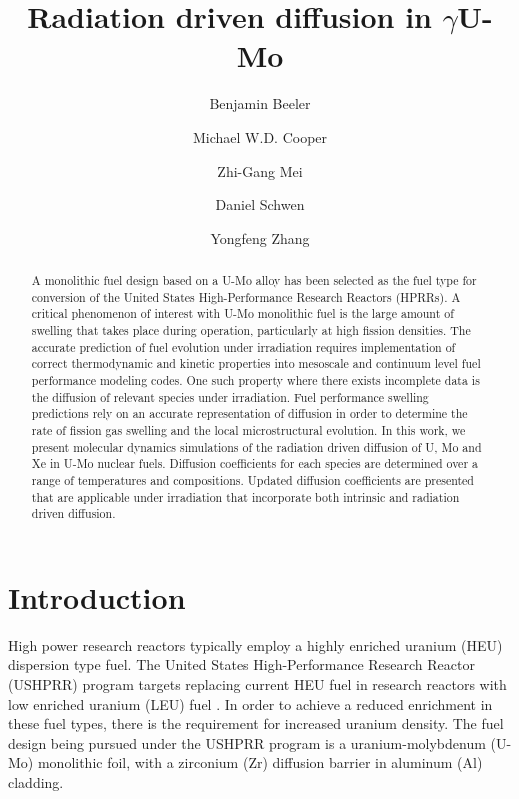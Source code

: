 \documentclass[review]{elsarticle}
\begin{document}
\begin{frontmatter}
\title{Radiation driven diffusion in $\gamma$U-Mo}

\author[ncsu,inl]{Benjamin Beeler}
\author[lanl]{Michael W.D. Cooper}
\author[anl]{Zhi-Gang Mei}
\author[inl]{Daniel Schwen}
\author[wisc,inl]{Yongfeng Zhang}
\address[ncsu]{North Carolina State University, Raleigh, NC 27695}
\address[inl]{Idaho National Laboratory, Idaho Falls, ID 83415}
\address[lanl]{Los Alamos National Laboratory, Los Alamos, NM 87545}
\address[anl]{Argonne National Laboratory, Lemont, IL 60439}
\address[wisc]{University of Wisconsin-Madison, Madison, WI 53715}

\begin{abstract}
A monolithic fuel design based on a U-Mo alloy has been selected as the fuel type for conversion of the United States High-Performance Research Reactors (HPRRs). A critical phenomenon of interest with U-Mo monolithic fuel is the large amount of swelling that takes place during operation, particularly at high fission densities. The accurate prediction of fuel evolution under irradiation requires implementation of correct thermodynamic and kinetic properties into mesoscale and continuum level fuel performance modeling codes. One such property where there exists incomplete data is the diffusion of relevant species under irradiation. Fuel performance swelling predictions rely on an accurate representation of diffusion in order to determine the rate of fission gas swelling and the local microstructural evolution. In this work, we present molecular dynamics simulations of the radiation driven diffusion of U, Mo and Xe in U-Mo nuclear fuels. Diffusion coefficients for each species are determined over a range of temperatures and compositions. Updated diffusion coefficients are presented that are applicable under irradiation that incorporate both intrinsic and radiation driven diffusion. 


\end{abstract}
\end{frontmatter}

\linenumbers
\modulolinenumbers[5]

\section{Introduction}

High power research reactors typically employ a highly enriched uranium (HEU) dispersion type fuel. The United States High-Performance Research Reactor (USHPRR) program targets replacing current HEU fuel in research reactors with low enriched uranium (LEU) fuel \cite{snelgrove1997}. In order to achieve a reduced enrichment in these fuel types, there is the requirement for increased uranium density. The fuel design being pursued under the USHPRR program is a uranium-molybdenum (U-Mo) monolithic foil, with a zirconium (Zr) diffusion barrier in aluminum (Al) cladding.
\end{document}
